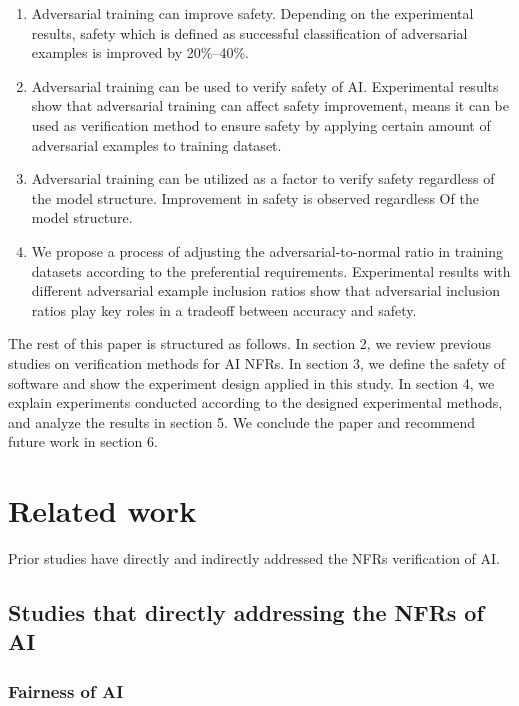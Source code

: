 \documentclass[symmetry,article,submit,moreauthors,pdftex]{Definitions/mdpi}
\begin{document}
\begin{enumerate}
    \item	Adversarial training can improve safety. Depending on the experimental results, safety which is defined as successful classification of adversarial examples is improved by 20\%--40\%.
    \item	Adversarial training can be used to verify safety of AI. Experimental results show that adversarial training can affect safety improvement, means it can be used as verification method to ensure safety by applying certain amount of adversarial examples to training dataset.
    \item   Adversarial training can be utilized as a factor to verify safety regardless of the model structure. Improvement in safety is observed regardless Of the model structure.
    \item	We propose a process of adjusting the adversarial-to-normal ratio in training datasets according to the preferential requirements. Experimental results with different adversarial example inclusion ratios show that adversarial inclusion ratios play key roles in a tradeoff between accuracy and safety.
\end{enumerate} 

The rest of this paper is structured as follows. In section 2, we review previous studies on verification methods for AI NFRs.
In section 3, we define the safety of software and show the experiment design applied in this study.
In section 4, we explain experiments conducted according to the designed experimental methods, and analyze the results in section 5.
We conclude the paper and recommend future work in section 6.

\section{Related work}

Prior studies have directly and indirectly addressed the NFRs verification of AI.

\subsection{Studies that directly addressing the NFRs of AI}

\subsubsection{Fairness of AI}
\end{document}
